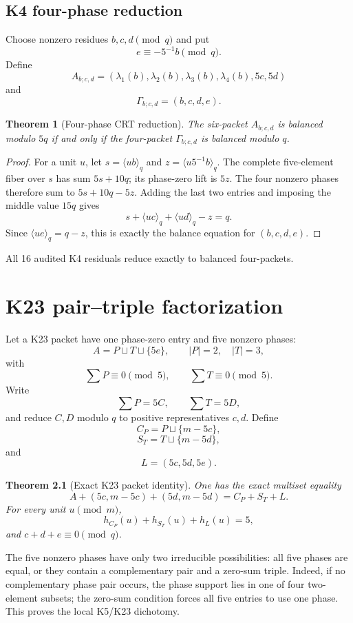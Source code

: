 \documentclass[11pt,oneside]{book}
\newtheorem{theorem}{Theorem}[chapter]
\theoremstyle{definition}
\theoremstyle{remark}
\begin{document}
\section{K4 four-phase reduction}
Choose nonzero residues \(b,c,d\pmod q\) and put
\[
e\equiv-5^{-1}b\pmod q.
\]
Define
\[
A_{b;c,d}=
(\lambda_1(b),\lambda_2(b),\lambda_3(b),\lambda_4(b),5c,5d)
\]
and
\[
\Gamma_{b;c,d}=(b,c,d,e).
\]

\begin{theorem}[Four-phase CRT reduction]
The six-packet \(A_{b;c,d}\) is balanced modulo \(5q\) if and only if the four-packet \(\Gamma_{b;c,d}\) is balanced modulo \(q\).
\end{theorem}
\begin{proof}
For a unit \(u\), let \(s=\langle ub\rangle_q\) and \(z=\langle u5^{-1}b\rangle_q\). The complete five-element fiber over \(s\) has sum \(5s+10q\); its phase-zero lift is \(5z\). The four nonzero phases therefore sum to \(5s+10q-5z\). Adding the last two entries and imposing the middle value \(15q\) gives
\[
s+\langle uc\rangle_q+\langle ud\rangle_q-z=q.
\]
Since \(\langle ue\rangle_q=q-z\), this is exactly the balance equation for \((b,c,d,e)\).
\end{proof}

All 16 audited K4 residuals reduce exactly to balanced four-packets.


\chapter{K23 pair--triple factorization}
Let a K23 packet have one phase-zero entry and five nonzero phases:
\[
A=P\sqcup T\sqcup\{5e\},
\qquad |P|=2,
\quad |T|=3,
\]
with
\[
\sum P\equiv0\pmod5,
\qquad
\sum T\equiv0\pmod5.
\]
Write
\[
\sum P=5C,
\qquad
\sum T=5D,
\]
and reduce \(C,D\) modulo \(q\) to positive representatives \(c,d\). Define
\[
C_P=P\sqcup\{m-5c\},
\]
\[
S_T=T\sqcup\{m-5d\},
\]
and
\[
L=(5c,5d,5e).
\]

\begin{theorem}[Exact K23 packet identity]
One has the exact multiset equality
\[
\boxed{
A+(5c,m-5c)+(5d,m-5d)=C_P+S_T+L.
}
\tag{15.1}
\]
For every unit \(u\pmod m\),
\[
h_{C_P}(u)+h_{S_T}(u)+h_L(u)=5,
\]
and \(c+d+e\equiv0\pmod q\).
\end{theorem}

The five nonzero phases have only two irreducible possibilities: all five phases are equal, or they contain a complementary pair and a zero-sum triple. Indeed, if no complementary phase pair occurs, the phase support lies in one of four two-element subsets; the zero-sum condition forces all five entries to use one phase. This proves the local K5/K23 dichotomy.
\end{document}
